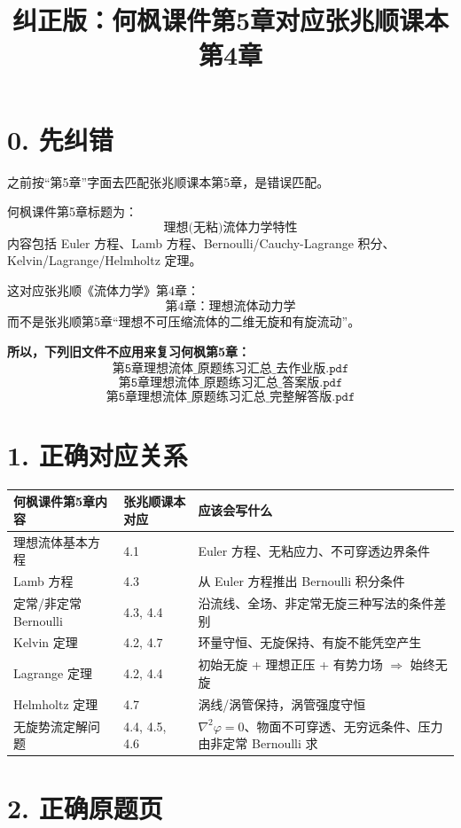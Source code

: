\documentclass[UTF8,zihao=-4]{ctexart}
\title{\bfseries 纠正版：何枫课件第5章对应张兆顺课本第4章}
\author{}
\date{}
\begin{document}
\maketitle

\section*{0. 先纠错}

之前按“第5章”字面去匹配张兆顺课本第5章，是错误匹配。

何枫课件第5章标题为：
\[
\text{理想(无粘)流体力学特性}
\]
内容包括 Euler 方程、Lamb 方程、Bernoulli/Cauchy-Lagrange 积分、Kelvin/Lagrange/Helmholtz 定理。

这对应张兆顺《流体力学》第4章：
\[
\text{第4章：理想流体动力学}
\]
而不是张兆顺第5章“理想不可压缩流体的二维无旋和有旋流动”。

\textbf{所以，下列旧文件不应用来复习何枫第5章：}
\[
\texttt{第5章理想流体\_原题练习汇总\_去作业版.pdf}
\]
\[
\texttt{第5章理想流体\_原题练习汇总\_答案版.pdf}
\]
\[
\texttt{第5章理想流体\_原题练习汇总\_完整解答版.pdf}
\]

\section*{1. 正确对应关系}

\begin{longtable}{p{4.2cm}p{4.9cm}p{6cm}}
\toprule
何枫课件第5章内容 & 张兆顺课本对应 & 应该会写什么 \\
\midrule
理想流体基本方程 & 4.1 & Euler 方程、无粘应力、不可穿透边界条件 \\
Lamb 方程 & 4.3 & 从 Euler 方程推出 Bernoulli 积分条件 \\
定常/非定常 Bernoulli & 4.3, 4.4 & 沿流线、全场、非定常无旋三种写法的条件差别 \\
Kelvin 定理 & 4.2, 4.7 & 环量守恒、无旋保持、有旋不能凭空产生 \\
Lagrange 定理 & 4.2, 4.4 & 初始无旋 + 理想正压 + 有势力场 \(\Rightarrow\) 始终无旋 \\
Helmholtz 定理 & 4.7 & 涡线/涡管保持，涡管强度守恒 \\
无旋势流定解问题 & 4.4, 4.5, 4.6 & \(\nabla^2\varphi=0\)、物面不可穿透、无穷远条件、压力由非定常 Bernoulli 求 \\
\bottomrule
\end{longtable}

\section*{2. 正确原题页}
\end{document}
